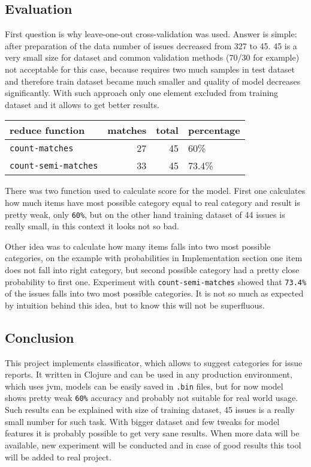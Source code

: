 \documentclass[14pt]{extarticle}
\begin{document}
\subsection{Evaluation}
\label{sec:org5af2b6e}
First question is why leave-one-out cross-validation was used. Answer is simple:
after preparation of the data number of issues decreased from 327 to 45. 45 is a
very small size for dataset and common validation methods (70/30 for example)
not acceptable for this case, because requires two much samples in test dataset
and therefore train dataset became much smaller and quality of model decreases
significantly. With such approach only one element excluded from training
dataset and it allows to get better results.

\begin{center}
\begin{tabular}{lrrl}
reduce function & matches & total & percentage\\
\hline
\texttt{count-matches} & 27 & 45 & 60\%\\
\texttt{count-semi-matches} & 33 & 45 & 73.4\%\\
\end{tabular}
\end{center}

There was two function used to calculate score for the model. First one
calculates how much items have most possible category equal to real category and
result is pretty weak, only \texttt{60\%}, but on the other hand training dataset of 44
issues is really small, in this context it looks not so bad.

Other idea was to calculate how many items falls into two most possible
categories, on the example with probabilities in Implementation section one item
does not fall into right category, but second possible category had a pretty
close probability to first one. Experiment with \texttt{count-semi-matches} showed that
\texttt{73.4\%} of the issues falls into two most possible categories. It is not so much
as expected by intuition behind this idea, but to know this will not be
superfluous.

\subsection{Conclusion}
\label{sec:orgbc9f117}
This project implements classificator, which allows to suggest categories for
issue reports. It written in Clojure and can be used in any production
environment, which uses jvm, models can be easily saved in \texttt{.bin} files, but for
now model shows pretty weak \texttt{60\%} accuracy and probably not suitable for real
world usage. Such results can be explained with size of training dataset, 45
issues is a really small number for such task. With bigger dataset and few
tweaks for model features it is probably possible to get very sane results. When
more data will be available, new experiment will be conducted and in case of
good results this tool will be added to real project.



\end{document}
